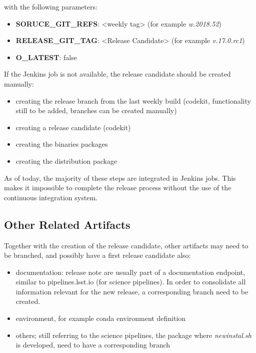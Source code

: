 with the following parameters:

\begin{itemize}
\item {\bf SORUCE\_GIT\_REFS}: <weekly tag> (for example \textit{w.2018.52})
\item {\bf RELEASE\_GIT\_TAG}: <Release Candidate> (for example \textit{v.17.0.rc1})
\item {\bf O\_LATEST}: false
\end{itemize}


If the Jenkins job is not available, the release candidate should be created manually:

\begin{itemize}
\item creating the release branch from the last weekly build (codekit, functionality still to be added, branches can be created manually)
\item creating a release candidate (codekit)
\item creating the binaries packages
\item creating the distribution package
\end{itemize}

As of today, the majority of these steps are integrated in Jenkins jobs. This makes it impossible to complete the release process without the use of the continuous integration system.

\subsection{Other Related Artifacts}

Together with the creation of the release candidate, other artifacts may need to be branched, and possibly have a first release candidate also:

\begin{itemize}
\item documentation: release note are usually part of a documentation endpoint, similar to pipelines.lsst.io (for science pipelines). In order to consolidate all information relevant for the new release, a corresponding branch need to be created.
\item environment, for example conda environment definition
\item others; still referring to the science pipelines, the package where \textit{newinstal.sh} is developed, need to have a corresponding branch
\end{itemize}


